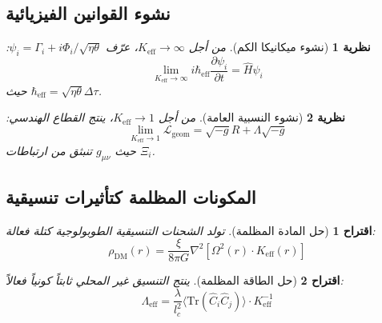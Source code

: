 \documentclass[11pt,a4paper]{article}
\newtheorem{theorem}{نظرية}
\newtheorem{proposition}{اقتراح}
\begin{document}
	\subsection{نشوء القوانين الفيزيائية}
	\begin{theorem}[نشوء ميكانيكا الكم]
		من أجل $K_{\mathrm{eff}} \to \infty$، عرّف $\psi_i = \Gamma_i + i\Phi_i/\sqrt{\eta\theta}$:
		\[
		\lim_{K_{\mathrm{eff}} \to \infty} i\hbar_{\mathrm{eff}}\frac{\partial\psi_i}{\partial t} = \hat{H}\psi_i
		\]
		حيث $\hbar_{\mathrm{eff}} = \sqrt{\eta\theta}\Delta\tau$.
	\end{theorem}
	
	\begin{theorem}[نشوء النسبية العامة]
		من أجل $K_{\mathrm{eff}} \to 1$، ينتج القطاع الهندسي:
		\[
		\lim_{K_{\mathrm{eff}} \to 1} \mathcal{L}_{\mathrm{geom}} = \sqrt{-g}R + \Lambda\sqrt{-g}
		\]
		حيث $g_{\mu\nu}$ تنبثق من ارتباطات $\Xi_i$.
	\end{theorem}
	
	\subsection{المكونات المظلمة كتأثيرات تنسيقية}
	\begin{proposition}[حل المادة المظلمة]
		تولد الشحنات التنسيقية الطوبولوجية كتلة فعالة:
		\[
		\rho_{\mathrm{DM}}(r) = \frac{\xi}{8\pi G} \nabla^2 \left[ \Omega^2(r) \cdot K_{\mathrm{eff}}(r) \right]
		\]
	\end{proposition}
	
	\begin{proposition}[حل الطاقة المظلمة]
		ينتج التنسيق غير المحلي ثابتاً كونياً فعالاً:
		\[
		\Lambda_{\mathrm{eff}} = \frac{\lambda}{l_c^2} \langle \mathrm{Tr}(\hat{C}_i\hat{C}_j) \rangle \cdot K_{\mathrm{eff}}^{-1}
		\]
	\end{proposition}
	
\end{document}
